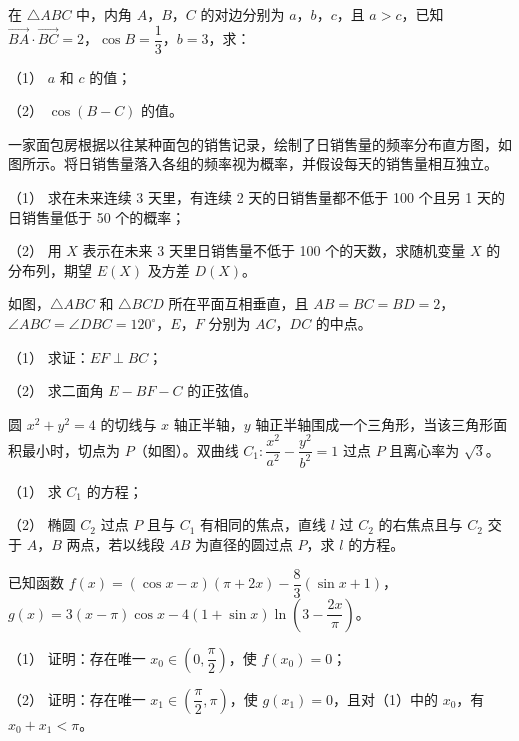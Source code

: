 \begin{question}
在 $\triangle ABC$ 中，内角 $A$，$B$，$C$ 的对边分别为 $a$，$b$，$c$，且 $a>c$，已知 $\overrightarrow{BA}\cdot\overrightarrow{BC}=2$，$\cos B=\dfrac13$，$b=3$，求：

（1） $a$ 和 $c$ 的值；

（2） $\cos(B-C)$ 的值。

\Needspace{0.4\textheight}
\end{question}
\begin{question}
一家面包房根据以往某种面包的销售记录，绘制了日销售量的频率分布直方图，如图所示。将日销售量落入各组的频率视为概率，并假设每天的销售量相互独立。
\nopagebreak[4]
\begin{center}\end{center}
\nopagebreak[4]
（1） 求在未来连续 3 天里，有连续 2 天的日销售量都不低于 100 个且另 1 天的日销售量低于 50 个的概率；

（2） 用 $X$ 表示在未来 3 天里日销售量不低于 100 个的天数，求随机变量 $X$ 的分布列，期望 $E(X)$ 及方差 $D(X)$。

\Needspace{0.4\textheight}
\end{question}
\begin{question}
如图，$\triangle ABC$ 和 $\triangle BCD$ 所在平面互相垂直，且 $AB=BC=BD=2$，$\angle ABC=\angle DBC=120^\circ$，$E$，$F$ 分别为 $AC$，$DC$ 的中点。
\nopagebreak[4]
\begin{center}\end{center}
\nopagebreak[4]
（1） 求证：$EF\perp BC$；

（2） 求二面角 $E-BF-C$ 的正弦值。

\Needspace{0.4\textheight}
\end{question}
\begin{question}
圆 $x^2+y^2=4$ 的切线与 $x$ 轴正半轴，$y$ 轴正半轴围成一个三角形，当该三角形面积最小时，切点为 $P$（如图）。双曲线 $C_1:\dfrac{x^2}{a^2}-\dfrac{y^2}{b^2}=1$ 过点 $P$ 且离心率为 $\sqrt3$。
\nopagebreak[4]
\begin{center}\end{center}
\nopagebreak[4]
（1） 求 $C_1$ 的方程；

（2） 椭圆 $C_2$ 过点 $P$ 且与 $C_1$ 有相同的焦点，直线 $l$ 过 $C_2$ 的右焦点且与 $C_2$ 交于 $A$，$B$ 两点，若以线段 $AB$ 为直径的圆过点 $P$，求 $l$ 的方程。

\end{question}
\begin{question}
已知函数 $f(x)=(\cos x-x)(\pi+2x)-\dfrac83(\sin x+1)$，$g(x)=3(x-\pi)\cos x-4(1+\sin x)\ln\left(3-\dfrac{2x}{\pi}\right)$。

（1） 证明：存在唯一 $x_0\in\left(0,\dfrac\pi2\right)$，使 $f(x_0)=0$；

（2） 证明：存在唯一 $x_1\in\left(\dfrac\pi2,\pi\right)$，使 $g(x_1)=0$，且对（1）中的 $x_0$，有 $x_0+x_1<\pi$。

\end{question}

